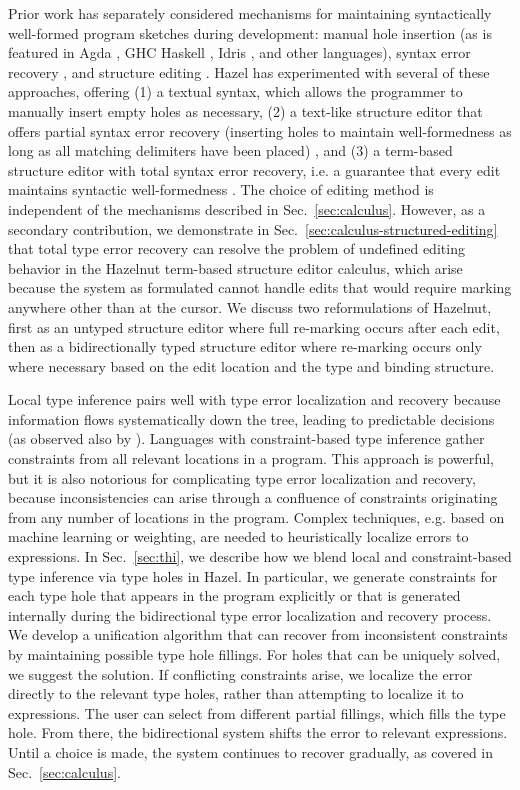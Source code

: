 Prior work has separately considered mechanisms for maintaining syntactically well-formed program sketches during development: manual hole insertion (as is featured in Agda \cite{agda}, GHC Haskell \cite{haskell-holes}, Idris \cite{idris-holes}, and other languages), syntax error recovery \cite{error-reovery}, and structure editing \cite{HazelnutPOPL}. 
Hazel has experimented with several of these approaches, offering (1) a textual syntax, which allows the programmer to manually insert empty holes as necessary, (2) a text-like structure editor that offers partial syntax error recovery (inserting holes to maintain well-formedness as long as all matching delimiters have been placed) \cite{tylr}, and (3) a term-based structure editor with total syntax error recovery, i.e. a guarantee that every edit maintains syntactic well-formedness \cite{HazelnutPOPL}. The choice of editing method is independent of the mechanisms described in Sec.~\ref{sec:calculus}. However, as a secondary contribution, 
we demonstrate in Sec.~\ref{sec:calculus-structured-editing} that total type error recovery can resolve the problem of undefined editing behavior in the Hazelnut term-based structure editor calculus, which arise because the system as formulated cannot handle edits that would require marking anywhere other than at the cursor. We discuss two reformulations of Hazelnut, first as an untyped structure editor where full re-marking occurs after each edit, then as a bidirectionally typed structure editor where re-marking occurs only where necessary based on the edit location and the type and binding structure.

Local type inference pairs well with type error localization and recovery because information flows systematically down the tree, leading to predictable decisions (as observed also by \cite{pierce}). Languages with constraint-based type inference gather constraints from all relevant locations in a program. This approach is powerful, but it is also notorious for complicating type error localization and recovery, because inconsistencies can arise through a confluence of constraints originating from any number of locations in the program. 
Complex techniques, e.g. based on machine learning or weighting, are needed to heuristically localize errors to expressions. 
In Sec.~\ref{sec:thi}, we describe how we blend local and constraint-based type inference via type holes in Hazel. In particular, 
we generate constraints for each type hole that appears in the program explicitly or that is  generated internally during the bidirectional type error localization and recovery process. 
We develop a unification algorithm that can recover from inconsistent constraints by maintaining possible type hole fillings. For holes that can be uniquely solved, we suggest the solution. 
If conflicting constraints arise, we localize the error directly to the relevant type holes, rather 
than attempting to localize it to expressions. 
The user can select from different partial fillings, which fills the type hole. From there, the bidirectional system shifts the error to relevant expressions.
Until a choice is made, the system continues to recover gradually, as covered in Sec.~\ref{sec:calculus}.


